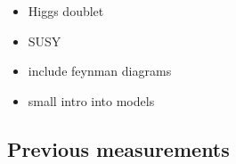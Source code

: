 



{\color{Red}
\begin{itemize}
\item Higgs doublet
\item SUSY 
\item include feynman diagrams
\item small intro into models
\end{itemize}}

\subsection{Previous measurements}

